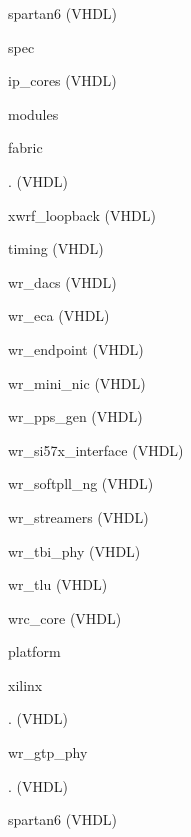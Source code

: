 \begin{dig}
\begin{dig}
\begin{dig}
\begin{dig}
\begin{dig}
\begin{dig}
                    \item spartan6 (VHDL)
                    \end{dig}  
                \end{dig}            
            \item spec
                \begin{dig}
                \item ip\_cores (VHDL)
                \end{dig}  
            \end{dig}
        \end{dig}
    \end{dig}
\item modules
    \begin{dig}
    \item fabric
        \begin{dig}
        \item . (VHDL)
        \item xwrf\_loopback (VHDL)
        \end{dig}
    \item timing (VHDL)
    \item wr\_dacs (VHDL)
    \item wr\_eca (VHDL)
    \item wr\_endpoint (VHDL)
    \item wr\_mini\_nic (VHDL)
    \item wr\_pps\_gen (VHDL)
    \item wr\_si57x\_interface (VHDL)
    \item wr\_softpll\_ng (VHDL)
    \item wr\_streamers (VHDL)
    \item wr\_tbi\_phy (VHDL)
    \item wr\_tlu (VHDL)
    \item wrc\_core (VHDL)
    \end{dig}
\item platform
    \begin{dig}
    \item xilinx
        \begin{dig}
        \item . (VHDL)
        \item wr\_gtp\_phy
            \begin{dig}
            \item . (VHDL)
            \item spartan6 (VHDL)
            \end{dig}
        \end{dig}
    \end{dig}
\end{dig}

